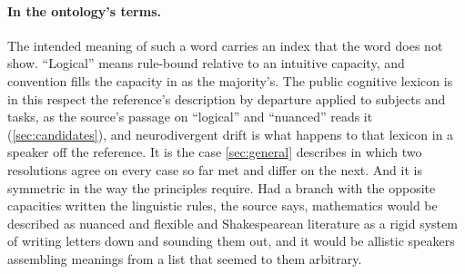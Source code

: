 \paragraph{In the ontology's terms.} The intended meaning of such a word carries an index that the word does not show. ``Logical'' means rule-bound relative to an intuitive capacity, and convention fills the capacity in as the majority's. The public cognitive lexicon is in this respect the reference's description by departure applied to subjects and tasks, as the source's passage on ``logical'' and ``nuanced'' reads it (\autoref{sec:candidates}), and neurodivergent drift is what happens to that lexicon in a speaker off the reference. It is the case \autoref{sec:general} describes in which two resolutions agree on every case so far met and differ on the next. And it is symmetric in the way the principles require. Had a branch with the opposite capacities written the linguistic rules, the source says, mathematics would be described as nuanced and flexible and Shakespearean literature as a rigid system of writing letters down and sounding them out, and it would be allistic speakers assembling meanings from a list that seemed to them arbitrary.

